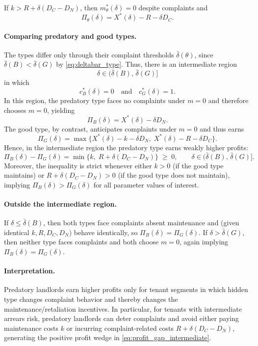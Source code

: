 \documentclass[11pt]{article}
\begin{document}
If $k > R + \delta(D_C-D_N)$, then $m^*_\theta(\delta)=0$ despite complaints and
\begin{equation}
\Pi_\theta(\delta)= X^*(\delta) - R - \delta D_C.
\label{eq:profit_regionB_nomaint}
\end{equation}

\paragraph{Comparing predatory and good types.}
The types differ only through their complaint thresholds $\bar\delta(\theta)$, since $\bar\delta(B)<\bar\delta(G)$ by \eqref{eq:deltabar_type}. Thus, there is an intermediate region
\[
\delta \in \big(\bar\delta(B),\,\bar\delta(G)\big]
\]
in which
\[
c^*_B(\delta)=0 \quad \text{and} \quad c^*_G(\delta)=1.
\]
In this region, the predatory type faces no complaints under $m=0$ and therefore chooses $m=0$, yielding
\[
\Pi_B(\delta)=X^*(\delta)-\delta D_N.
\]
The good type, by contrast, anticipates complaints under $m=0$ and thus earns
\[
\Pi_G(\delta)=
\max\Big\{X^*(\delta)-k-\delta D_N,\; X^*(\delta)-R-\delta D_C\Big\}.
\]
Hence, in the intermediate region the predatory type earns weakly higher profits:
\begin{equation}
\Pi_B(\delta)-\Pi_G(\delta)
=
\min\Big\{k,\; R+\delta(D_C-D_N)\Big\}
\;\ge\; 0,
\qquad
\delta \in \big(\bar\delta(B),\,\bar\delta(G)\big].
\label{eq:profit_gap_intermediate}
\end{equation}
Moreover, the inequality is strict whenever either $k>0$ (if the good type maintains) or $R+\delta(D_C-D_N)>0$ (if the good type does not maintain), implying $\Pi_B(\delta)>\Pi_G(\delta)$ for all parameter values of interest.

\paragraph{Outside the intermediate region.}
If $\delta \le \bar\delta(B)$, then both types face complaints absent maintenance and (given identical $k,R,D_C,D_N$) behave identically, so $\Pi_B(\delta)=\Pi_G(\delta)$. If $\delta > \bar\delta(G)$, then neither type faces complaints and both choose $m=0$, again implying $\Pi_B(\delta)=\Pi_G(\delta)$.

\paragraph{Interpretation.}
Predatory landlords earn higher profits only for tenant segments in which hidden type changes complaint behavior and thereby changes the maintenance/retaliation incentives. In particular, for tenants with intermediate arrears risk, predatory landlords can deter complaints and avoid either paying maintenance costs $k$ or incurring complaint-related costs $R+\delta(D_C-D_N)$, generating the positive profit wedge in \eqref{eq:profit_gap_intermediate}.
\end{document}
